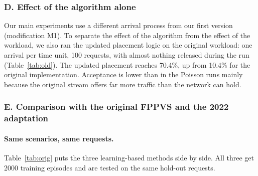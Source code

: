 \subsubsection*{D. Effect of the algorithm alone}

Our main experiments use a different arrival process from our first version
(modification M1). To separate the effect of the algorithm from the effect of the
workload, we also ran the updated placement logic on the original workload: one
arrival per time unit, 100 requests, with almost nothing released during the run
(Table~\ref{tab:old}). The updated placement reaches 70.4\%, up from 10.4\% for
the original implementation. Acceptance is lower than in the Poisson runs mainly
because the original stream offers far more traffic than the network can hold.

\begin{table}[H]
\centering\small
\caption{Original workload (one arrival per time unit), 5 seeds. The upper
rows are from our first implementation; the lower rows use the updated
environment and placement logic.}
\label{tab:old}

\end{table}

\subsubsection*{E. Comparison with the original FPPVS and the 2022 adaptation}\label{sec:paper}

\paragraph{Same scenarios, same requests.} Table~\ref{tab:orig} puts the three
learning-based methods side by side. All three get 2000 training episodes and
are tested on the same hold-out requests.

\begin{table}[H]
\centering\small
\caption{Original FPPVS, the 2022 adaptation and updated FPPVS on identical
scenarios, mean over \numSeeds{} seeds. $^\ast$Gain = updated FPPVS minus the
better of the other two, in percentage points.}
\label{tab:orig}

\end{table}

